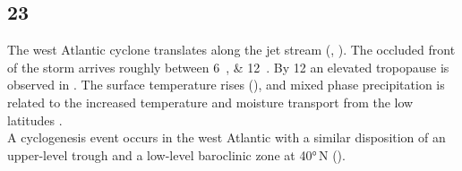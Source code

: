 \subsection*{\SI{23}{\dec}}
The west Atlantic cyclone translates along the jet stream (, ). The occluded front of the storm arrives roughly between \SIlist{6;12}{\UTC}. By \SI{12}{\UTC} an elevated tropopause is observed in . The surface temperature rises (), and mixed phase precipitation is related to the increased temperature and moisture transport from the low latitudes .  
\\
A cyclogenesis event occurs in the west Atlantic with a similar disposition of an upper-level trough and a low-level baroclinic zone at \ang{40}{\,N} ().
